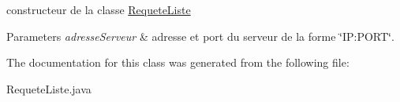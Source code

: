 constructeur de la classe \hyperlink{classrequete_1_1RequeteListe}{Requete\+Liste} 


\begin{DoxyParams}{Parameters}
{\em adresse\+Serveur} & adresse et port du serveur de la forme \char`\"{}\+I\+P\+:\+P\+O\+R\+T\char`\"{}. \\
\hline
\end{DoxyParams}


The documentation for this class was generated from the following file\+:\begin{DoxyCompactItemize}
\item 
Requete\+Liste.\+java\end{DoxyCompactItemize}
